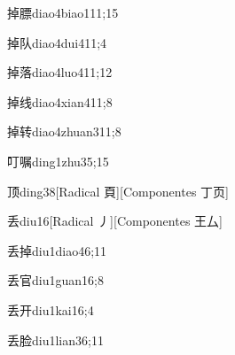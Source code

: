 \begin{verbete}{掉膘}{diao4biao1}{11;15}
\end{verbete}

\begin{verbete}{掉队}{diao4dui4}{11;4}
\end{verbete}

\begin{verbete}{掉落}{diao4luo4}{11;12}
\end{verbete}

\begin{verbete}{掉线}{diao4xian4}{11;8}
\end{verbete}

\begin{verbete}{掉转}{diao4zhuan3}{11;8}
\end{verbete}

\begin{verbete}{叮嘱}{ding1zhu3}{5;15}
\end{verbete}

\begin{verbete}{顶}{ding3}{8}[Radical 頁][Componentes 丁⻚]
\end{verbete}

\begin{verbete}{丢}{diu1}{6}[Radical 丿][Componentes 王厶]
\end{verbete}

\begin{verbete}{丢掉}{diu1diao4}{6;11}
\end{verbete}

\begin{verbete}{丢官}{diu1guan1}{6;8}
\end{verbete}

\begin{verbete}{丢开}{diu1kai1}{6;4}
\end{verbete}

\begin{verbete}{丢脸}{diu1lian3}{6;11}
\end{verbete}

